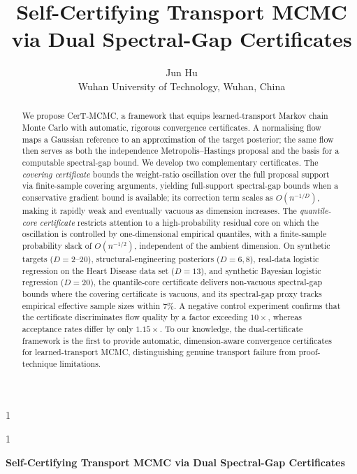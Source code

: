 \documentclass[12pt]{article}
\newcommand{\anon}{1}
\begin{document}
\def\spacingset#1{\renewcommand{\baselinestretch}{#1}\small\normalsize}
\spacingset{1}

\anon
{
  \title{\bf Self-Certifying Transport MCMC via Dual Spectral-Gap Certificates}
  \author{Jun Hu\\
    Wuhan University of Technology, Wuhan, China}
  \date{}
  \maketitle
} \fi

\anon
{
  \bigskip\bigskip\bigskip
  \begin{center}
    {\LARGE\bf Self-Certifying Transport MCMC via Dual Spectral-Gap Certificates}
  \end{center}
  \medskip
} \fi

\bigskip
\begin{abstract}
We propose CerT-MCMC, a framework that equips learned-transport Markov chain Monte Carlo with automatic, rigorous convergence certificates.
A normalising flow maps a Gaussian reference to an approximation of the target posterior; the same flow then serves as both the independence Metropolis--Hastings proposal and the basis for a computable spectral-gap bound.
We develop two complementary certificates.
The \emph{covering certificate} bounds the weight-ratio oscillation over the full proposal support via finite-sample covering arguments, yielding full-support spectral-gap bounds when a conservative gradient bound is available; its correction term scales as $O(n^{-1/D})$, making it rapidly weak and eventually vacuous as dimension increases.
The \emph{quantile-core certificate} restricts attention to a high-probability residual core on which the oscillation is controlled by one-dimensional empirical quantiles, with a finite-sample probability slack of $O(n^{-1/2})$, independent of the ambient dimension.
On synthetic targets ($D = 2$--$20$), structural-engineering posteriors ($D = 6,8$), real-data logistic regression on the Heart Disease data set ($D = 13$), and synthetic Bayesian logistic regression ($D = 20$), the quantile-core certificate delivers non-vacuous spectral-gap bounds where the covering certificate is vacuous, and its spectral-gap proxy tracks empirical effective sample sizes within $7\%$.
A negative control experiment confirms that the certificate discriminates flow quality by a factor exceeding $10\times$, whereas acceptance rates differ by only $1.15\times$.
To our knowledge, the dual-certificate framework is the first to provide automatic, dimension-aware convergence certificates for learned-transport MCMC, distinguishing genuine transport failure from proof-technique limitations.
\end{abstract}
\end{document}
